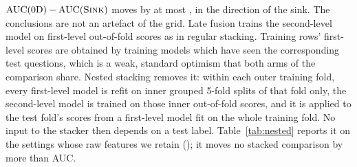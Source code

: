 $\mathrm{AUC}(0\text{D})-\mathrm{AUC}(\textsc{Sink})$ moves by at most \CGridTOneShiftMax{}, in the direction of the sink. The conclusions are not an artefact of the grid. Late fusion trains the second-level model on first-level out-of-fold scores as in regular stacking. Training rows' first-level scores are obtained by training models which have seen the corresponding test questions, which is a weak, standard optimism that both arms of the comparison share. Nested stacking removes it: within each outer training fold, every first-level model is refit on inner grouped 5-fold splits of that fold only, the second-level model is trained on those inner out-of-fold scores, and it is applied to the test fold's scores from a first-level model fit on the whole training fold. No input to the stacker then depends on a test label. Table~\ref{tab:nested} reports it on the \NestN{} settings whose raw features we retain (\NestList{}); it moves no stacked comparison by more than \NestMaxShift{} AUC.
\begin{table}[h]
\centering
\small
\caption{\textbf{Late fusion with nested stacking} ($\Delta$AUC; first-level models refit inside every outer training fold). NT: all non-topological features; $\defect_h$: per-head coning defect; TOHA: supervised probe on TOHA's per-head scores; $\bar\pi$: the same probe on the $\bar\pi$-score. $^{\equiv}$: equivalent within $\pm0.015$; $^{*}$: 95\% interval excludes $0$; both marks can apply.}
\label{tab:nested}
\setlength{\tabcolsep}{3pt}\SinkTableNested
\end{table}
\begin{table}[h]
\centering
\small
\caption{\textbf{A wider regularization grid} ($\Delta$AUC, wider grid minus reported). Every bank of every setting whose features we retain is refit with $C$ tuned over $\{10^{-4},10^{-3},10^{-2},10^{-1},1,10,10^{2}\}$ by the same inner grouped 3-fold CV, including the banks the reported rule fits at a fixed $C=1$. Same seeds, splitter and scaler otherwise. \CGridBanks{} banks per setting are compared; the \CGridShown{} of Table~\ref{tab:auc}, plus answer-only PH (\emph{Ans.}), are shown. \CGridLayerOnlyN{} settings kept only their per-layer features, so their hidden-state and per-head banks cannot be rebuilt and are shown as dashes.}
\label{tab:cgrid}
\setlength{\tabcolsep}{3pt}\resizebox{\linewidth}{!}{\SinkTableCGrid}
\end{table}



